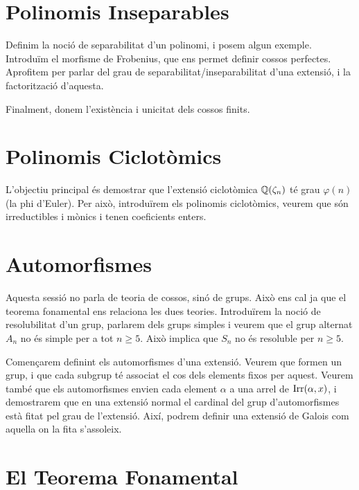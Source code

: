 \documentclass[
]{book}
\theoremstyle{definition}
\theoremstyle{definition}
\theoremstyle{definition}
\theoremstyle{definition}
\theoremstyle{remark}
\begin{document}
\hypertarget{polinomis-inseparables}{%
\chapter{Polinomis Inseparables}\label{polinomis-inseparables}}

Definim la noció de separabilitat d'un polinomi, i posem algun exemple. Introduïm el morfisme de Frobenius,
que ens permet definir cossos perfectes. Aprofitem per parlar del grau de separabilitat/inseparabilitat d'una
extensió, i la factorització d'aquesta.

Finalment, donem l'existència i unicitat dels cossos finits.

\hypertarget{polinomis-ciclotuxf2mics}{%
\chapter{Polinomis Ciclotòmics}\label{polinomis-ciclotuxf2mics}}

L'objectiu principal és demostrar que l'extensió ciclotòmica \(\mathbb{Q}(\zeta_n)\) té grau \(\varphi(n)\) (la phi d'Euler). Per això,
introduïrem els polinomis ciclotòmics, veurem que són irreductibles i mònics i tenen coeficients enters.

\hypertarget{automorfismes}{%
\chapter{Automorfismes}\label{automorfismes}}

Aquesta sessió no parla de teoria de cossos, sinó de grups. Això ens cal ja que el teorema fonamental ens relaciona les dues teories. Introduïrem
la noció de resolubilitat d'un grup, parlarem dels grups simples i veurem que el grup alternat \(A_n\) no és simple per a tot \(n \geq 5\). Això
implica que \(S_n\) no és resoluble per \(n\geq 5\).

Començarem definint els automorfismes d'una extensió. Veurem que formen
un grup, i que cada subgrup té associat el cos dels elements fixos per aquest. Veurem també
que els automorfismes envien cada element \(\alpha\) a una arrel de \(\operatorname{Irr}(\alpha,x)\),
i demostrarem que en una extensió normal el cardinal del grup d'automorfismes està
fitat pel grau de l'extensió. Així, podrem definir una extensió de Galois com aquella
on la fita s'assoleix.

\hypertarget{el-teorema-fonamental}{%
\chapter{El Teorema Fonamental}\label{el-teorema-fonamental}}
\end{document}
